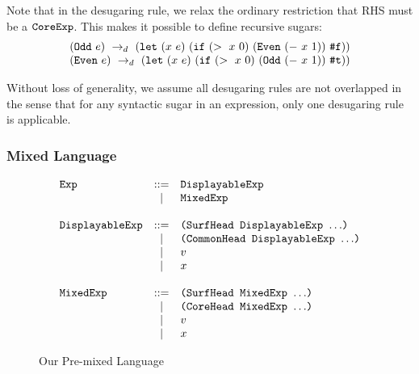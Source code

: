 Note that in the desugaring rule, we relax the ordinary restriction that RHS must be a $\mbox{\tt CoreExp}$. This makes it possible to define recursive sugars:
\[
\begin{array}{l}
(\mbox{\tt Odd}~e) ~\rightarrow_d~ (\mbox{\tt let}~(x~e)~(\mbox{\tt if}~(>~x~0)~(\mbox{\tt Even}~(-~x~1))~\mbox{\tt \#f}))\\
(\mbox{\tt Even}~e) ~\rightarrow_d~ (\mbox{\tt let}~(x~e)~(\mbox{\tt if}~(>~x~0)~(\mbox{\tt Odd}~(-~x~1))~\mbox{\tt \#t}))
\end{array}
\]


Without loss of generality, we assume all desugaring rules are not overlapped in the sense that for any syntactic sugar in an expression, only one desugaring rule is applicable.


\subsubsection{Mixed Language}
\begin{figure}[t]
\begin{centering}
{\footnotesize
\[
			\begin{array}{lcl}
			\mbox{\tt Exp} &::=& \mbox{\tt DisplayableExp}\\
			&|& \mbox{\tt MixedExp}\\
			\\
			\mbox{\tt DisplayableExp} &::=& \mbox{\tt (SurfHead~DisplayableExp~$\ldots$)}\\
			&|& \mbox{\tt (CommonHead~DisplayableExp~$\ldots$)}\\
			&|& v\\
			&|& x\\
			\\
			\mbox{\tt MixedExp} &::=& \mbox{\tt (SurfHead~MixedExp~$\ldots$)}\\
			&|& \mbox{\tt (CoreHead~MixedExp~$\ldots$)}\\
			&|& v\\
			&|& x\\
			\end{array}
			\]
}

\end{centering}
\caption{Our Pre-mixed Language}
\label{fig:mix}
\end{figure}

